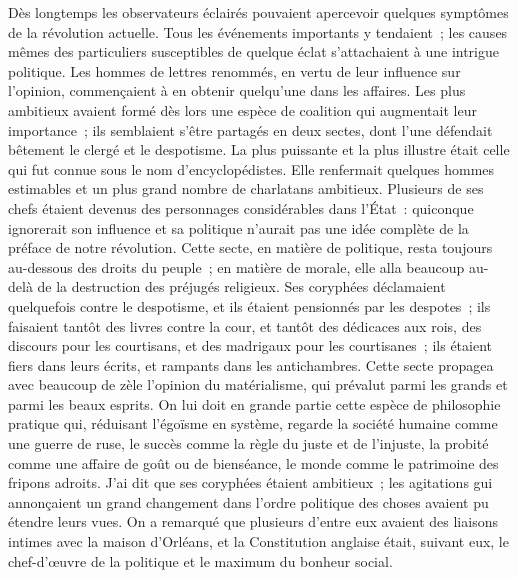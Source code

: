 \documentclass[french,twoside]{book} %
\begin{document}
Dès longtemps les observateurs éclairés pouvaient apercevoir quelques symptômes de la révolution actuelle. Tous les événements importants y tendaient ; les causes mêmes des particuliers susceptibles de quelque éclat s’attachaient à une intrigue politique. Les hommes de lettres renommés, en vertu de leur influence sur l’opinion, commençaient à en obtenir quelqu’une dans les affaires. Les plus ambitieux avaient formé dès lors une espèce de coalition qui augmentait leur importance ; ils semblaient s’être partagés en deux sectes, dont l’une défendait bêtement le clergé et le despotisme. La plus puissante et la plus illustre était celle qui fut connue sous le nom d’encyclopédistes. Elle renfermait quelques hommes estimables et un plus grand nombre de charlatans ambitieux. Plusieurs de ses chefs étaient devenus des personnages considérables dans l’État : quiconque ignorerait son influence et sa politique n’aurait pas une idée complète de la préface de notre révolution. Cette secte, en matière de politique, resta toujours au-dessous des droits du peuple ; en matière de morale, elle alla beaucoup au-delà de la destruction des préjugés religieux. Ses coryphées déclamaient quelquefois contre le despotisme, et ils étaient pensionnés par les despotes ; ils faisaient tantôt des livres contre la cour, et tantôt des dédicaces aux rois, des discours pour les courtisans, et des madrigaux pour les courtisanes ; ils étaient fiers dans leurs écrits, et rampants dans les antichambres. Cette secte propagea avec beaucoup de zèle l’opinion du matérialisme, qui prévalut parmi les grands et parmi les beaux esprits. On lui doit en grande partie cette espèce de philosophie pratique qui, réduisant l’égoïsme en système, regarde la société humaine comme une guerre de ruse, le succès comme la règle du juste et de l’injuste, la probité comme une affaire de goût ou de bienséance, le monde comme le patrimoine des fripons adroits. J’ai dit que ses coryphées étaient ambitieux ; les agitations gui annonçaient un grand changement dans l’ordre politique des choses avaient pu étendre leurs vues. On a remarqué que plusieurs d’entre eux avaient des liaisons intimes avec la maison d’Orléans, et la Constitution anglaise était, suivant eux, le chef-d’œuvre de la politique et le maximum du bonheur social.\par
\end{document}
